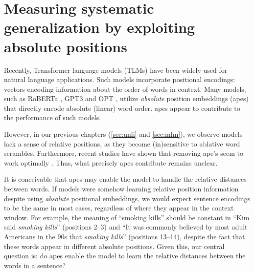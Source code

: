 \documentclass[letterpaper, 12pt]{report}
\begin{document}



\clearpage
\chapter{Measuring systematic generalization by exploiting absolute positions}
\label{sec:pos}

Recently, Transformer \citep{vaswani-etal-2017-attention} language models (TLMs) have been widely used for natural language applications. Such models incorporate positional encodings: vectors encoding information about the order of words in context. Many models, such as RoBERTa \citep{liu-et-al-2019-roberta}, GPT3 \citep{Brown2020:GPT3} and OPT \citep{Zhang2022:OPT}, utilize \textit{absolute} position embeddings (\acrshort{ape}s) that directly encode absolute (linear) word order. \acrshort{ape}s appear to contribute to the performance of such models.

However, in our previous chapters (\autoref{sec:unli} and \autoref{sec:mlm}), we observe models lack a sense of relative positions, as they become (in)sensitive to ablative word scrambles. Furthermore, recent studies have shown that removing \acrshort{ape}'s seem to work optimally \citep{haviv2022}. Thus, what precisely \acrshort{ape}s contribute remains unclear.

It is conceivable that \acrshort{ape}s may enable the model to handle the relative distances between words. %
If models were somehow learning relative position information despite using \emph{absolute} positional embeddings, we would expect sentence encodings to be the same in most cases, regardless of where they appear in the context window. For example, the meaning of ``smoking kills'' should be constant in ``Kim said \textit{smoking kills}'' (positions 2--3)  and ``It was commonly believed by most adult Americans in the 90s that \textit{smoking kills}'' (positions 13--14), despite the fact that these words appear in different absolute positions.
Given this, our central question is: do \acrshort{ape}s enable the model to learn the relative distances between the words in a sentence?
\end{document}
